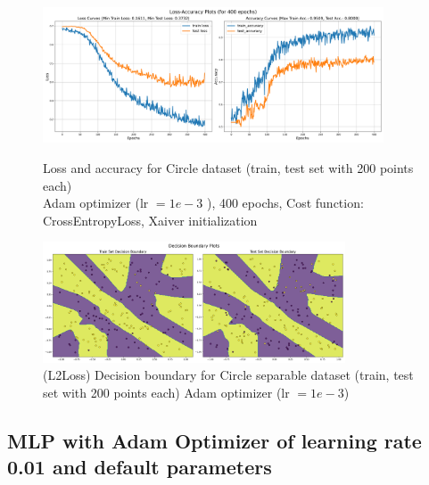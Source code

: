 \begin{solve}
\begin{figure}[H]
    \centering
    \includegraphics[width=0.9\textwidth]{plots/sinusoid_adam-lr-1e-3_more_layersloss_acc.png}
    \caption{Loss and accuracy for Circle dataset (train, test set with 200 points each)\\ Adam optimizer (lr $=1e-3$ ), 400 epochs, Cost function: CrossEntropyLoss, Xaiver initialization}
    \includegraphics[width=0.8\textwidth]{plots/sinusoid_adam-lr-1e-3_more_layersboundary.png}
    \caption{(L2Loss) Decision boundary for Circle separable dataset (train, test set with 200 points each) 
    Adam optimizer (lr $=1e-3$)}
\end{figure}



\subsection{MLP with Adam Optimizer of learning rate 0.01 and default parameters}


\end{solve}
